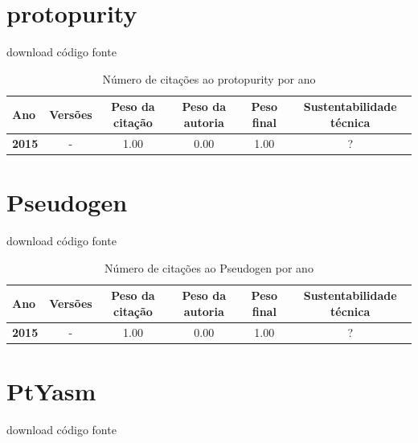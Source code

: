 \section{protopurity}
\checkmark download
\checkmark código fonte



\begin{table}[H]
\caption{Número de citações ao protopurity por ano}
\centering
\begin{tabular}{| l | c | c | c | c | c |}
  \hline
  Ano & Versões & Peso da citação & Peso da autoria & Peso final & Sustentabilidade técnica \\
  \hline
            {\bf 2015}
          &
          -
          &
          1.00
          &
          0.00
          &
            {\color{blue} 1.00}
          &
          ?
          \\
\hline
\end{tabular}
\end{table}



\section{Pseudogen}
\checkmark download
\checkmark código fonte



\begin{table}[H]
\caption{Número de citações ao Pseudogen por ano}
\centering
\begin{tabular}{| l | c | c | c | c | c |}
  \hline
  Ano & Versões & Peso da citação & Peso da autoria & Peso final & Sustentabilidade técnica \\
  \hline
            {\bf 2015}
          &
          -
          &
          1.00
          &
          0.00
          &
            {\color{blue} 1.00}
          &
          ?
          \\
\hline
\end{tabular}
\end{table}



\section{PtYasm}
\checkmark download
\checkmark código fonte



